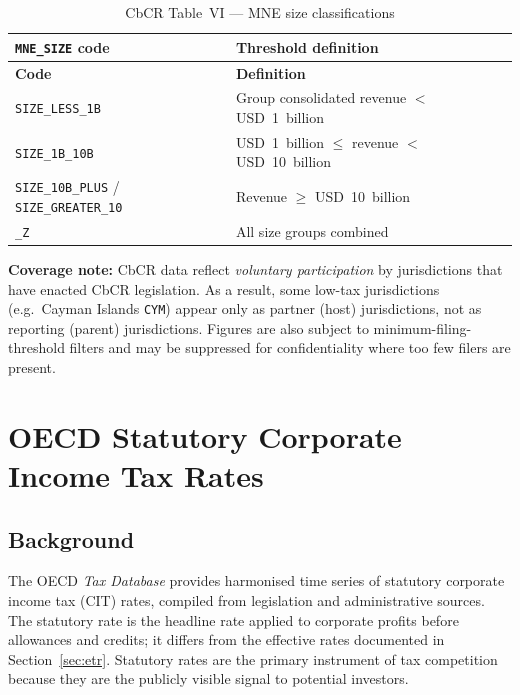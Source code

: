 \documentclass[11pt,a4paper]{article}
\begin{document}
\begin{longtable}{L{3.2cm} L{8.0cm}}
    \caption{CbCR Table~VI --- MNE size classifications}
    \label{tab:cbcr_t6_size}\\
    \toprule
    \textbf{\texttt{MNE\_SIZE} code} & \textbf{Threshold definition} \\
    \midrule
    \endfirsthead
    \toprule
    \textbf{Code} & \textbf{Definition} \\
    \midrule
    \endhead
    \bottomrule
    \endlastfoot
    \texttt{SIZE\_LESS\_1B}     & Group consolidated revenue $<$ USD~1~billion \\
    \texttt{SIZE\_1B\_10B}      & USD~1~billion $\leq$ revenue $<$ USD~10~billion \\
    \texttt{SIZE\_10B\_PLUS} / \texttt{SIZE\_GREATER\_10} & Revenue $\geq$ USD~10~billion \\
    \texttt{\_Z}                 & All size groups combined \\
\end{longtable}

\noindent\textbf{Coverage note:} CbCR data reflect \emph{voluntary participation} by
jurisdictions that have enacted CbCR legislation.  As a result, some
low-tax jurisdictions (e.g.\ Cayman Islands \texttt{CYM}) appear only as partner
(host) jurisdictions, not as reporting (parent) jurisdictions.  Figures are
also subject to minimum-filing-threshold filters and may be suppressed for
confidentiality where too few filers are present.


\section{OECD Statutory Corporate Income Tax Rates}
\label{sec:cit}

\subsection{Background}
\label{subsec:cit_background}

The OECD \emph{Tax Database} provides harmonised time series of statutory
corporate income tax (CIT) rates, compiled from legislation and administrative
sources.  The statutory rate is the headline rate applied to corporate profits
before allowances and credits; it differs from the effective rates documented
in Section~\ref{sec:etr}.  Statutory rates are the primary instrument of tax
competition because they are the publicly visible signal to potential investors.
\end{document}
